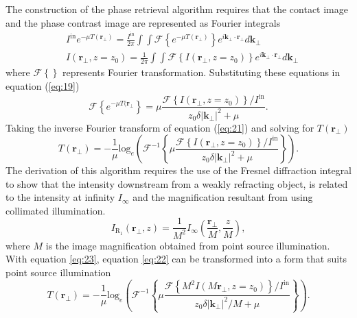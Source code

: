 \documentclass[10pt, a4paper, singlespacing]{report}
\begin{document}
The construction of the phase retrieval algorithm requires that the contact image and the phase contrast image are represented as Fourier integrals\cite{Pags2002}
\begin{align}\label{eq:20}
&I^{\mathrm{in}} e^{-\mu T(\mathbf{r}_{\perp})} = \frac{I^{\mathrm{in}}}{2 \pi} \int \int \mathscr{F} \left \{ e^{-\mu T(\mathbf{r}_{\perp})} \right \} e^{i \mathbf{k}_{\perp}\cdot \mathbf{r}_{\perp}} d \mathbf{k}_{\perp}
\\&I(\mathbf{r}_{\perp}, z=z_0) = \frac{1}{2 \pi}  \int \int \mathscr{F} \left \{ I (\mathbf{r}_{\perp}, z = z_0) \right \} e^{i \mathbf{k}_{\perp}\cdot \mathbf{r}_{\perp}} d \mathbf{k}_{\perp}
\end{align}
where $\mathscr{F}\left \{ \right \}$ represents Fourier transformation. Substituting these equations in equation (\ref{eq:19})
\begin{equation}\label{eq:21}
\mathscr{F}\left \{ e^{-\mu T(\mathbf{r}_{\perp}} \right \} = \mu \frac{\mathscr{F}\left \{ I(\mathbf{r}_{\perp}, z=z_0)\right \}/I^{\mathrm{in}}}{z_0 \delta |\mathbf{k}_{\perp}|^{2} + \mu}.
\end{equation}
Taking the inverse Fourier transform of equation (\ref{eq:21}) and solving for $T(\mathbf{r}_{\perp})$
\begin{equation}\label{eq:22}
T(\mathbf{r}_{\perp}) = - \frac{1}{\mu} \mathrm{log}_{e} \left ( \mathscr{F}^{-1} \left \{ \mu \frac{ \mathscr{F} \left \{I(\mathbf{r}_{\perp}, z=z_0) \right \} /  I^{\mathrm{in}}}{z_0 \delta |\mathbf{k}_{\perp}|^{2} + \mu}  \right \} \right ).
\end{equation}
The derivation of this algorithm requires the use of the Fresnel diffraction integral to show that the intensity downstream from a weakly refracting object, is related to the intensity at infinity $I_{\infty}$ and the magnification resultant from using collimated illumination\cite{Pags2002}.
\begin{equation}\label{eq:23}
I_{\mathrm{R_{1}}}(\mathbf{r_{\perp}}, z) = \frac{1}{M^2} I_{\infty} \left ( \frac{\mathbf{r_\perp}}{M}, \frac{z}{M} \right ),
\end{equation}
where $M$ is the image magnification obtained from point source illumination. With equation \ref{eq:23}, equation \ref{eq:22} can be transformed into a form that suits point source illumination\cite{Pags2002}
\begin{equation}\label{eq:24}
T(\mathbf{r}_{\perp}) = - \frac{1}{\mu} \mathrm{log}_{e} \left ( \mathscr{F}^{-1} \left \{ \mu \frac{ \mathscr{F} \left \{M^2 I(M\mathbf{r}_{\perp}, z=z_0) \right \} /  I^{\mathrm{in}}}{z_0 \delta |\mathbf{k}_{\perp}|^{2}/M + \mu}  \right \} \right ).
\end{equation}
\end{document}
